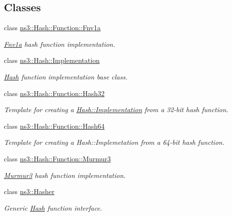 \subsection*{Classes}
\begin{DoxyCompactItemize}
\item 
class \hyperlink{classns3_1_1Hash_1_1Function_1_1Fnv1a}{ns3\+::\+Hash\+::\+Function\+::\+Fnv1a}
\begin{DoxyCompactList}\small\item\em \hyperlink{classns3_1_1Hash_1_1Function_1_1Fnv1a}{Fnv1a} hash function implementation. \end{DoxyCompactList}\item 
class \hyperlink{classns3_1_1Hash_1_1Implementation}{ns3\+::\+Hash\+::\+Implementation}
\begin{DoxyCompactList}\small\item\em \hyperlink{namespacens3_1_1Hash}{Hash} function implementation base class. \end{DoxyCompactList}\item 
class \hyperlink{classns3_1_1Hash_1_1Function_1_1Hash32}{ns3\+::\+Hash\+::\+Function\+::\+Hash32}
\begin{DoxyCompactList}\small\item\em Template for creating a \hyperlink{classns3_1_1Hash_1_1Implementation}{Hash\+::\+Implementation} from a 32-\/bit hash function. \end{DoxyCompactList}\item 
class \hyperlink{classns3_1_1Hash_1_1Function_1_1Hash64}{ns3\+::\+Hash\+::\+Function\+::\+Hash64}
\begin{DoxyCompactList}\small\item\em Template for creating a Hash\+::\+Implemetation from a 64-\/bit hash function. \end{DoxyCompactList}\item 
class \hyperlink{classns3_1_1Hash_1_1Function_1_1Murmur3}{ns3\+::\+Hash\+::\+Function\+::\+Murmur3}
\begin{DoxyCompactList}\small\item\em \hyperlink{classns3_1_1Hash_1_1Function_1_1Murmur3}{Murmur3} hash function implementation. \end{DoxyCompactList}\item 
class \hyperlink{classns3_1_1Hasher}{ns3\+::\+Hasher}
\begin{DoxyCompactList}\small\item\em Generic \hyperlink{namespacens3_1_1Hash}{Hash} function interface. \end{DoxyCompactList}\end{DoxyCompactItemize}
